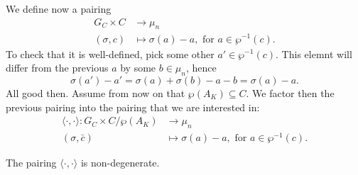 \documentclass[12pt]{amsart}
\begin{document}
We define now a pairing
\begin{align*}
    G_{C}\times C &\longrightarrow \mu_{n} \\
    (\sigma,c) &\longmapsto \sigma(a)-a, \text{ for }a\in \wp^{-1}(c).
\end{align*}
To check that it is well-defined, pick some other $a'\in \wp^{-1}(c)$.
This elemnt will differ from the previous $a$ by some $b\in \mu_{n}$, hence
\[ \sigma(a')-a'=\sigma(a)+\sigma(b)-a-b=\sigma(a)-a. \]
All good then.
Assume from now on that $\wp(A_{K})\subseteq C$.
We factor then the previous pairing into the pairing that we are interested in:
\begin{align*}
    \langle \cdot,\cdot\rangle \colon G_{C}\times C/\wp(A_{K}) &\longrightarrow \mu_{n} \\
    (\sigma,\bar{c}) & \longmapsto \sigma(a)-a, \text{ for }a\in \wp^{-1}(c).
\end{align*}

\begin{lm}
    The pairing $\langle \cdot,\cdot\rangle$ is non-degenerate.
\end{lm}

\newpage


\vfill
\end{document}
